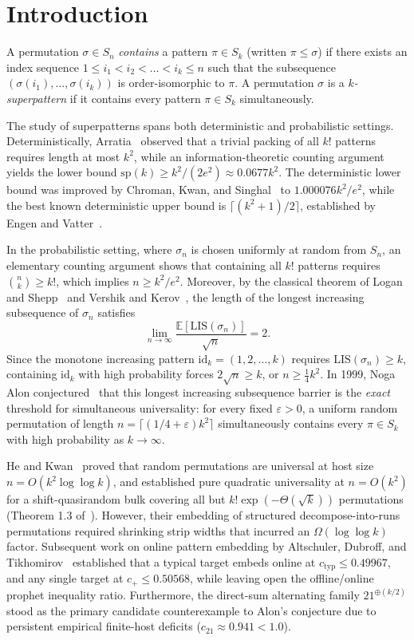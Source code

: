 \documentclass[
  11pt,
]{article}
\begin{document}
\section{Introduction}\label{sec:intro}

A permutation $\sigma \in S_n$ \emph{contains} a pattern $\pi \in S_k$ (written $\pi \le \sigma$) if there exists an index sequence $1 \le i_1 < i_2 < \dots < i_k \le n$ such that the subsequence $(\sigma(i_1), \dots, \sigma(i_k))$ is order-isomorphic to $\pi$. A permutation $\sigma$ is a \emph{$k$-superpattern} if it contains every pattern $\pi \in S_k$ simultaneously.

The study of superpatterns spans both deterministic and probabilistic settings. Deterministically, Arratia~\cite{ref-Arratia99} observed that a trivial packing of all $k!$ patterns requires length at most $k^2$, while an information-theoretic counting argument yields the lower bound $\mathrm{sp}(k) \ge k^2/(2e^2) \approx 0.0677 k^2$. The deterministic lower bound was improved by Chroman, Kwan, and Singhal~\cite{ref-CKS21} to $1.000076 k^2/e^2$, while the best known deterministic upper bound is $\lceil(k^2 + 1)/2\rceil$, established by Engen and Vatter~\cite{ref-EV21}.

In the probabilistic setting, where $\sigma_n$ is chosen uniformly at random from $S_n$, an elementary counting argument shows that containing all $k!$ patterns requires $\binom{n}{k} \ge k!$, which implies $n \ge k^2 / e^2$. Moreover, by the classical theorem of Logan and Shepp~\cite{ref-LS77} and Vershik and Kerov~\cite{ref-VK77}, the length of the longest increasing subsequence of $\sigma_n$ satisfies
\[
\lim_{n \to \infty} \frac{\mathbb{E}[\mathrm{LIS}(\sigma_n)]}{\sqrt{n}} = 2.
\]
Since the monotone increasing pattern $\mathrm{id}_k = (1, 2, \dots, k)$ requires $\mathrm{LIS}(\sigma_n) \ge k$, containing $\mathrm{id}_k$ with high probability forces $2\sqrt{n} \ge k$, or $n \ge \frac{1}{4} k^2$.
In 1999, Noga Alon conjectured~\cite{ref-HK20} that this longest increasing subsequence barrier is the \emph{exact} threshold for simultaneous universality: for every fixed $\varepsilon > 0$, a uniform random permutation of length $n = \lceil(1/4 + \varepsilon)k^2\rceil$ simultaneously contains every $\pi \in S_k$ with high probability as $k \to \infty$.

He and Kwan~\cite{ref-HK20} proved that random permutations are universal at host size $n = O(k^2 \log \log k)$, and established pure quadratic universality at $n = O(k^2)$ for a shift-quasirandom bulk covering all but $k! \exp(-\Theta(\sqrt{k}))$ permutations (Theorem 1.3 of~\cite{ref-HK20}). However, their embedding of structured decompose-into-runs permutations required shrinking strip widths that incurred an $\Omega(\log \log k)$ factor. Subsequent work on online pattern embedding by Altschuler, Dubroff, and Tikhomirov~\cite{ref-ADT26} established that a typical target embeds online at $c_{\mathrm{typ}} \le 0.49967$, and any single target at $c_+ \le 0.50568$, while leaving open the offline/online prophet inequality ratio. Furthermore, the direct-sum alternating family $21^{\oplus (k/2)}$ stood as the primary candidate counterexample to Alon's conjecture due to persistent empirical finite-host deficits ($c_{21} \approx 0.941 < 1.0$).
\end{document}
